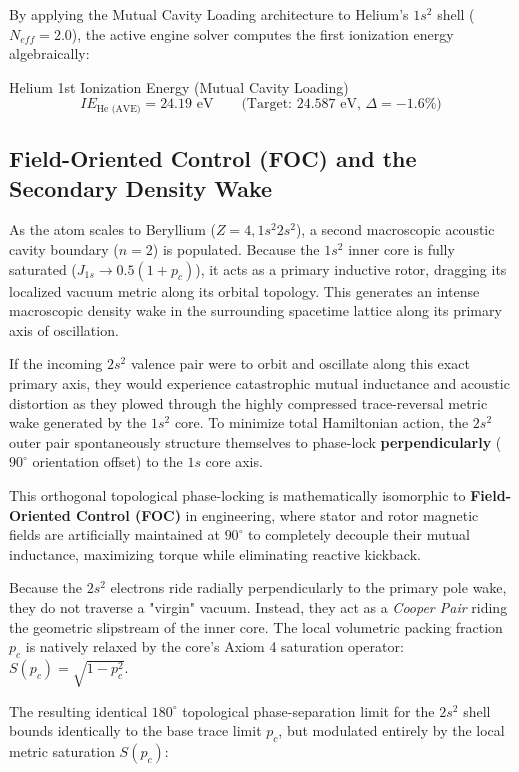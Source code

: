 By applying the Mutual Cavity Loading architecture to Helium's $1s^2$ shell ($N_{eff} = 2.0$), the active engine solver computes the first ionization energy algebraically:
\begin{resultbox}{Helium 1st Ionization Energy (Mutual Cavity Loading)}
\begin{equation}
    IE_\text{He (AVE)} = 24.19\text{ eV} \qquad \text{(Target: } 24.587\text{ eV, } \Delta = -1.6\%\text{)}
\end{equation}
\end{resultbox}

\subsection{Field-Oriented Control (FOC) and the Secondary Density Wake}
As the atom scales to Beryllium ($Z=4, 1s^2 2s^2$), a second macroscopic acoustic cavity boundary ($n=2$) is populated. Because the $1s^2$ inner core is fully saturated ($J_{1s} \to 0.5(1+p_c)$), it acts as a primary inductive rotor, dragging its localized vacuum metric along its orbital topology. This generates an intense macroscopic density wake in the surrounding spacetime lattice along its primary axis of oscillation.

If the incoming $2s^2$ valence pair were to orbit and oscillate along this exact primary axis, they would experience catastrophic mutual inductance and acoustic distortion as they plowed through the highly compressed trace-reversal metric wake generated by the $1s^2$ core. To minimize total Hamiltonian action, the $2s^2$ outer pair spontaneously structure themselves to phase-lock \textbf{perpendicularly} ($90^\circ$ orientation offset) to the $1s$ core axis. 

This orthogonal topological phase-locking is mathematically isomorphic to \textbf{Field-Oriented Control (FOC)} in engineering, where stator and rotor magnetic fields are artificially maintained at $90^\circ$ to completely decouple their mutual inductance, maximizing torque while eliminating reactive kickback.

Because the $2s^2$ electrons ride radially perpendicularly to the primary pole wake, they do not traverse a "virgin" vacuum. Instead, they act as a \textit{Cooper Pair} riding the geometric slipstream of the inner core. The local volumetric packing fraction $p_c$ is natively relaxed by the core's Axiom 4 saturation operator: $S(p_c) = \sqrt{1 - p_c^2}$. 

The resulting identical $180^\circ$ topological phase-separation limit for the $2s^2$ shell bounds identically to the base trace limit $p_c$, but modulated entirely by the local metric saturation $S(p_c)$:

